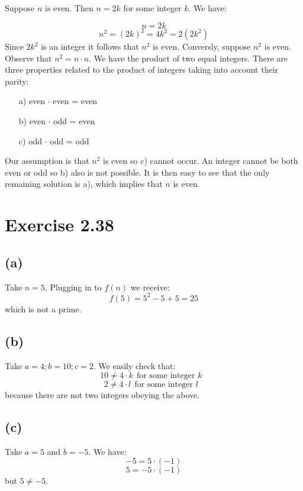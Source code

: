 \documentclass{article}
\begin{document}
Suppose \(n\) is even. Then \(n=2k\) for some integer \(k\). We have:

\begin{equation*}
	n = 2k
\end{equation*}
\begin{equation*}
	n^2 = (2k)^2 = 4k^2 = 2(2k^2)
\end{equation*}
Since \(2k^2\) is an integer it follows that \(n^2\) is even. Conversly, suppose \(n^2\) is even. Observe that \(n^2 = n \cdot n\). We have
the product of two equal integers. There are three properties related to the
product of integers taking into account their parity:

\begin{itemize}
	\item[a)]  even \(\cdot\) even = even  

	\item[b)] even \(\cdot\) odd = even 
		
	\item[c)] odd \(\cdot\) odd  = odd   
\end{itemize}

Our assumption is that \(n^2\) is even so c) cannot occur. An integer cannot be
both even or odd so b) also is not possible. It is then easy to see that the
only remaining solution is a), which implies that \(n\) is even. 

\section*{Exercise 2.38}

\subsection*{(a)}
Take \(n = 5\). Plugging in to \(f(n)\) we receive:
\begin{equation*}
	f(5) = 5^2 - 5 + 5 = 25
\end{equation*}
which is not a prime.
\subsection*{(b)}
Take \(a = 4; b=10; c=2\). We easily check that:
\begin{equation*}
	10 \neq 4 \cdot k \ \ \mbox{for some integer \(k\) }
\end{equation*}
\begin{equation*}
	2 \neq 4 \cdot l \ \ \mbox{for some integer \(l\) }
\end{equation*}
because there are not two integers obeying the above.
\subsection*{(c)}

Take \(a = 5\) and \(b = -5\). We have:
\begin{equation*}
	-5 = 5 \cdot (-1)
\end{equation*}
\begin{equation*}
	5 = -5 \cdot (-1)
\end{equation*}
but \(5 \neq -5\). 
\end{document}
